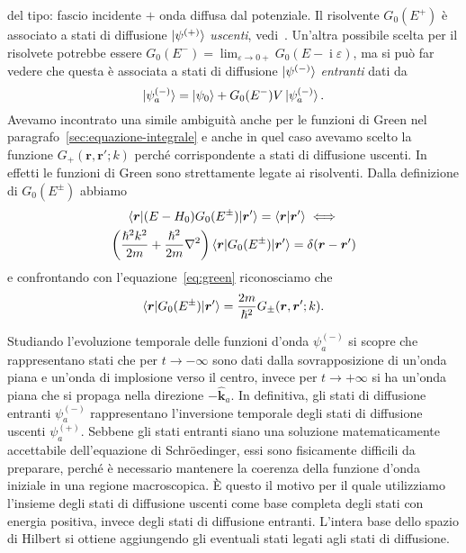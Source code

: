 \documentclass[a4paper,fleqn,twoside,12pt]{article}
\renewcommand{\epsilon}{\varepsilon}
\DeclareMathOperator{\uimm}{\mathrm{i}} %
\newcommand*{\versor}[1]{\hat{\bm{#1}}}
\begin{document}
del tipo: fascio incidente $+$ onda diffusa dal potenziale.  Il risolvente
$G_{0}(E^{+})$ è associato a stati di diffusione $\ket{\psi^{(+)}}$
\emph{uscenti}, vedi~\textcite[450-452]{ballentine:quantum-mechanics}.  Un'altra
possibile scelta per il risolvete potrebbe essere
$G_{0}(E^{-}) = \lim_{\epsilon \to 0+} G_{0}(E - \uimm \epsilon)$, ma si può far
vedere che questa è associata a stati di diffusione $\ket{\psi^{(-)}}$
\emph{entranti} dati da
\begin{equation}
  \ket{\psi_{a}^{(-)}} = \ket{\psi_{0}} + G_{0}(E^{-})V\ket{\psi_{a}^{(-)}}.
\end{equation}
Avevamo incontrato una simile ambiguità anche per le funzioni di Green nel
paragrafo~\ref{sec:equazione-integrale} e anche in quel caso avevamo scelto la
funzione $G_{+}(\bm{r},\bm{r}';k)$ perché corrispondente a stati di diffusione
uscenti.  In effetti le funzioni di Green sono strettamente legate ai
risolventi.  Dalla definizione di $G_{0}(E^{\pm})$ abbiamo
\begin{equation}
  \begin{gathered}
    \braket{\bm{r} | (E - H_{0})G_{0}(E^{\pm}) | \bm{r}'} = \braket{\bm{r} |
      \bm{r}'} \iff \\
    \bigg(\frac{\hslash^{2}k^{2}}{2m} + \frac{\hslash^{2}}{2m}\nabla^{2}\bigg)
    \braket{\bm{r} | G_{0}(E^{\pm}) | \bm{r}'} = \delta(\bm{r} - \bm{r}')
  \end{gathered}
\end{equation}
e confrontando con l'equazione~\eqref{eq:green} riconosciamo che
\begin{equation}
  \braket{\bm{r} | G_{0}(E^{\pm}) | \bm{r}'} =
  \frac{2m}{\hslash^{2}}G_{\pm}(\bm{r},\bm{r}';k).
\end{equation}

Studiando l'evoluzione temporale delle funzioni d'onda $\psi_{a}^{(-)}$ si
scopre che rappresentano stati che per $t \to -\infty$ sono dati dalla
sovrapposizione di un'onda piana e un'onda di implosione verso il centro, invece
per $t \to +\infty$ si ha un'onda piana che si propaga nella direzione
$-\versor{k}_{a}$.  In definitiva, gli stati di diffusione entranti
$\psi_{a}^{(-)}$ rappresentano l'inversione temporale degli stati di diffusione
uscenti $\psi_{a}^{(+)}$.  Sebbene gli stati entranti siano una soluzione
matematicamente accettabile dell'equazione di Schröedinger, essi sono
fisicamente difficili da preparare, perché è necessario mantenere la coerenza
della funzione d'onda iniziale in una regione macroscopica.  È questo il motivo
per il quale utilizziamo l'insieme degli stati di diffusione uscenti come base
completa degli stati con energia positiva, invece degli stati di diffusione
entranti.  L'intera base dello spazio di Hilbert si ottiene aggiungendo gli
eventuali stati legati agli stati di diffusione.
\end{document}
